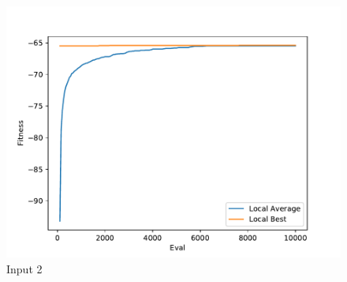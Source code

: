 \documentclass{standalone}
\begin{document}
\begin{figure}[!htb]
	\caption{Input 2}
	\label{fig:graph_2019}
	\includegraphics[width=\textwidth]{../graphs/graphs/2019.pdf}
\end{figure}
\end{document}
